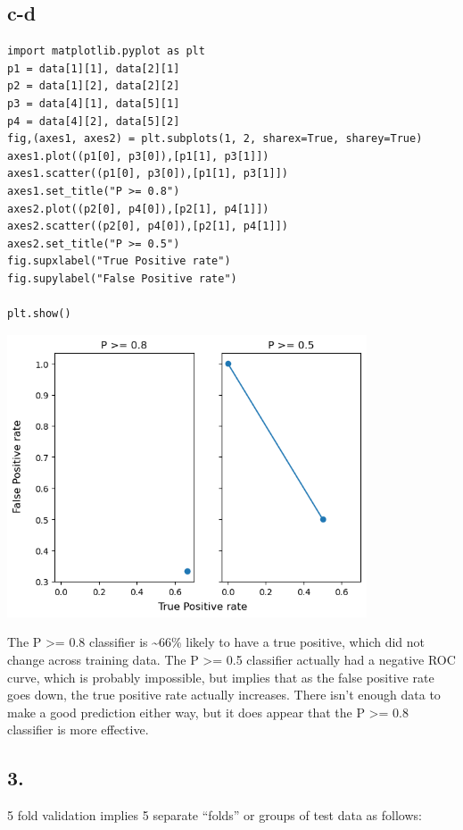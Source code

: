 \documentclass[11pt]{article}
\begin{document}
\subsection*{c-d}
\label{sec:org263a8ee}
\begin{verbatim}
import matplotlib.pyplot as plt
p1 = data[1][1], data[2][1]
p2 = data[1][2], data[2][2]
p3 = data[4][1], data[5][1]
p4 = data[4][2], data[5][2]
fig,(axes1, axes2) = plt.subplots(1, 2, sharex=True, sharey=True)
axes1.plot((p1[0], p3[0]),[p1[1], p3[1]])
axes1.scatter((p1[0], p3[0]),[p1[1], p3[1]])
axes1.set_title("P >= 0.8")
axes2.plot((p2[0], p4[0]),[p2[1], p4[1]])
axes2.scatter((p2[0], p4[0]),[p2[1], p4[1]])
axes2.set_title("P >= 0.5")
fig.supxlabel("True Positive rate")
fig.supylabel("False Positive rate")

plt.show()
\end{verbatim}
\begin{center}
\includegraphics[width=0.8\textwidth]{./.ob-jupyter/56aa79352d69672f8941ac1a635528d4d749ff50.png}
\end{center}

The P >= 0.8 classifier is \textasciitilde{}66\% likely to have a true positive, which did not
change across training data.  The P >= 0.5 classifier actually had a negative
ROC curve, which is probably impossible, but implies that as the false positive
rate goes down, the true positive rate actually increases. There isn't enough
data to make a good prediction either way, but it does appear that the P >= 0.8
classifier is more effective.


\subsection*{3.}
\label{sec:org1e38c58}
5 fold validation implies 5 separate ``folds'' or groups of test data as follows:
\end{document}
